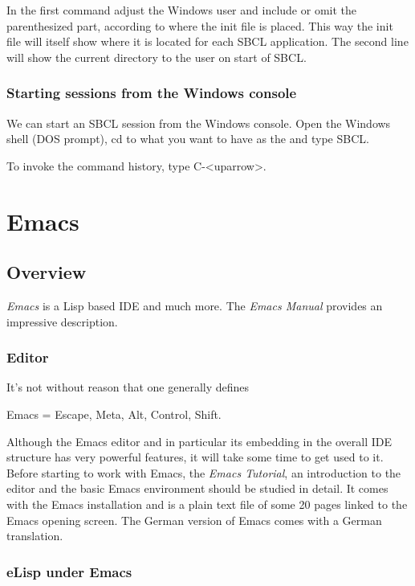 \documentclass[../Maxima_Workbook.tex]{subfiles}
\begin{document}
In the first command adjust the Windows user and include or omit the parenthesized part, according to where the init file is placed. This way the init file will itself show where it is located for each SBCL application. The second line will show the current directory to the user on start of SBCL.

\subsubsection{Starting sessions from the Windows console}

We can start an SBCL session from the Windows console. Open the Windows shell (DOS prompt), cd to what you want to have as the  and type SBCL.

\lz To invoke the command history, type C-<uparrow>.

\section{Emacs}

\subsection{Overview}

\emph{Emacs} is a Lisp based IDE and much more. The \emph{Emacs Manual} provides an impressive description.

\subsubsection{Editor}

It's not without reason that one generally defines
\begin{center}
	Emacs = Escape, Meta, Alt, Control, Shift.
\end{center}
Although the Emacs editor and in particular its embedding in the overall IDE structure has very powerful features, it will take some time to get used to it. Before starting to work with Emacs, the \emph{Emacs Tutorial}, an introduction to the editor and the basic Emacs environment should be studied in detail. It comes with the Emacs installation and is a plain text file of some 20 pages linked to the Emacs opening screen. The German version of Emacs comes with a German translation.

\subsubsection{eLisp under Emacs}
\end{document}
